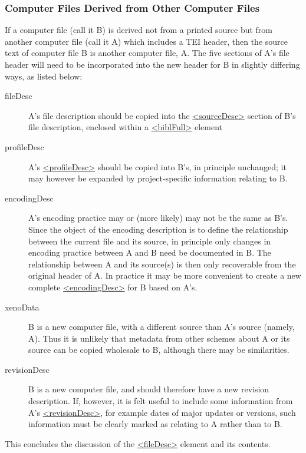 \subsubsection[{Computer Files Derived from Other Computer Files}]{Computer Files Derived from Other Computer Files}\label{HD31}\par
If a computer file (call it B) is derived not from a printed source but from another computer file (call it A) which includes a TEI header, then the source text of computer file B is another computer file, A. The five sections of A's file header will need to be incorporated into the new header for B in slightly differing ways, as listed below: \begin{description}

\item[{fileDesc}]A's file description should be copied into the \hyperref[TEI.sourceDesc]{<sourceDesc>} section of B's file description, enclosed within a \hyperref[TEI.biblFull]{<biblFull>} element
\item[{profileDesc}]A's \hyperref[TEI.profileDesc]{<profileDesc>} should be copied into B's, in principle unchanged; it may however be expanded by project-specific information relating to B.
\item[{encodingDesc}]A's encoding practice may or (more likely) may not be the same as B's. Since the object of the encoding description is to define the relationship between the current file and its source, in principle only changes in encoding practice between A and B need be documented in B. The relationship between A and its source(s) is then only recoverable from the original header of A. In practice it may be more convenient to create a new complete \hyperref[TEI.encodingDesc]{<encodingDesc>} for B based on A's.
\item[{xenoData}]B is a new computer file, with a different source than A's source (namely, A). Thus it is unlikely that metadata from other schemes about A or its source can be copied wholesale to B, although there may be similarities.
\item[{revisionDesc}]B is a new computer file, and should therefore have a new revision description. If, however, it is felt useful to include some information from A's \hyperref[TEI.revisionDesc]{<revisionDesc>}, for example dates of major updates or versions, such information must be clearly marked as relating to A rather than to B.
\end{description}  This concludes the discussion of the \hyperref[TEI.fileDesc]{<fileDesc>} element and its contents.

